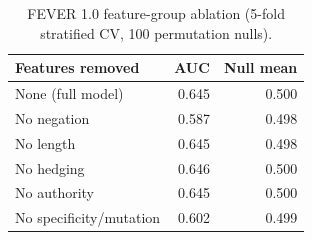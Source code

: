 \begin{table}[t]
\centering
\caption{FEVER 1.0 feature-group ablation (5-fold stratified CV, 100 permutation nulls).}
\label{tab:fever_ablation}
\begin{tabular}{lrr}
\toprule
Features removed & AUC & Null mean \\
\midrule
None (full model) & 0.645 & 0.500 \\
No negation & 0.587 & 0.498 \\
No length & 0.645 & 0.498 \\
No hedging & 0.646 & 0.500 \\
No authority & 0.645 & 0.500 \\
No specificity/mutation & 0.602 & 0.499 \\
\bottomrule
\end{tabular}
\end{table}

